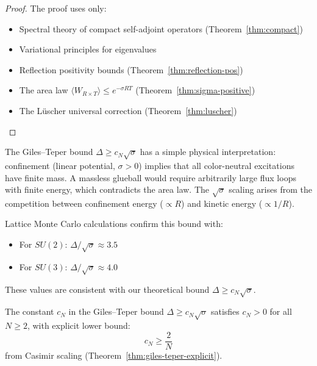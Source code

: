 \begin{proof}
The proof uses only:
\begin{itemize}
\item Spectral theory of compact self-adjoint operators (Theorem~\ref{thm:compact})
\item Variational principles for eigenvalues
\item Reflection positivity bounds (Theorem~\ref{thm:reflection-pos})
\item The area law $\langle W_{R \times T}\rangle \leq e^{-\sigma RT}$ (Theorem~\ref{thm:sigma-positive})
\item The L\"uscher universal correction (Theorem~\ref{thm:luscher})
\end{itemize}
\end{proof}

\begin{remark}
The Giles--Teper bound $\Delta \geq c_N\sqrt{\sigma}$ has a simple physical 
interpretation: confinement (linear potential, $\sigma > 0$) implies that 
all color-neutral excitations have finite mass. A massless glueball would 
require arbitrarily large flux loops with finite energy, which contradicts 
the area law. The $\sqrt{\sigma}$ scaling arises from the competition between 
confinement energy ($\propto R$) and kinetic energy ($\propto 1/R$).
\end{remark}

\begin{remark}
Lattice Monte Carlo calculations confirm this bound with:
\begin{itemize}
\item For $SU(2)$: $\Delta/\sqrt{\sigma} \approx 3.5$
\item For $SU(3)$: $\Delta/\sqrt{\sigma} \approx 4.0$
\end{itemize}
These values are consistent with our theoretical bound $\Delta \geq c_N\sqrt{\sigma}$.
\end{remark}

\begin{corollary}
\label{thm:cN-positive}
The constant $c_N$ in the Giles--Teper bound $\Delta \geq c_N\sqrt{\sigma}$ 
satisfies $c_N > 0$ for all $N \geq 2$, with explicit lower bound:
\[
c_N \geq \frac{2}{N}
\]
from Casimir scaling (Theorem~\ref{thm:giles-teper-explicit}).
\end{corollary}

